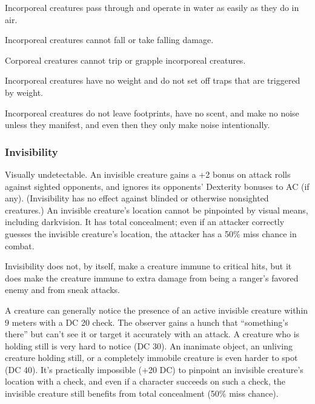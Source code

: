 Incorporeal creatures pass through and operate in water as easily as they do in air.

Incorporeal creatures cannot fall or take falling damage.

Corporeal creatures cannot trip or grapple incorporeal creatures.

Incorporeal creatures have no weight and do not set off traps that are triggered by weight.

Incorporeal creatures do not leave footprints, have no scent, and make no noise unless they manifest, and even then they only make noise intentionally.

\subsubsection{Invisibility}
Visually undetectable. An invisible creature gains a +2 bonus on attack rolls against sighted opponents, and ignores its opponents' Dexterity bonuses to AC (if any). (Invisibility has no effect against blinded or otherwise nonsighted creatures.) An invisible creature's location cannot be pinpointed by visual means, including darkvision. It has total concealment; even if an attacker correctly guesses the invisible creature's location, the attacker has a 50\% miss chance in combat.

Invisibility does not, by itself, make a creature immune to critical hits, but it does make the creature immune to extra damage from being a ranger's favored enemy and from sneak attacks.

A creature can generally notice the presence of an active invisible creature within 9 meters with a DC 20  check. The observer gains a hunch that ``something's there'' but can't see it or target it accurately with an attack. A creature who is holding still is very hard to notice (DC 30). An inanimate object, an unliving creature holding still, or a completely immobile creature is even harder to spot (DC 40). It's practically impossible (+20 DC) to pinpoint an invisible creature's location with a  check, and even if a character succeeds on such a check, the invisible creature still benefits from total concealment (50\% miss chance).


